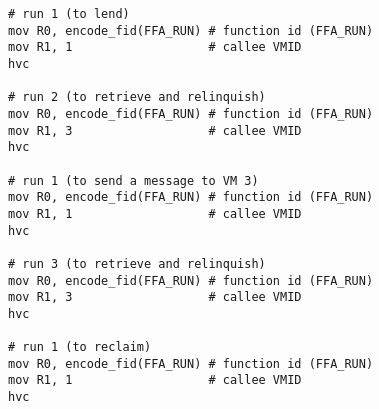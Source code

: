 \documentclass{article}
\begin{document}
\clearpage

\begin{lstlisting}[caption={VM 0}]
# run 1 (to lend)
mov R0, encode_fid(FFA_RUN) # function id (FFA_RUN)
mov R1, 1                   # callee VMID
hvc

# run 2 (to retrieve and relinquish)
mov R0, encode_fid(FFA_RUN) # function id (FFA_RUN)
mov R1, 3                   # callee VMID
hvc

# run 1 (to send a message to VM 3)
mov R0, encode_fid(FFA_RUN) # function id (FFA_RUN)
mov R1, 1                   # callee VMID
hvc

# run 3 (to retrieve and relinquish)
mov R0, encode_fid(FFA_RUN) # function id (FFA_RUN)
mov R1, 3                   # callee VMID
hvc

# run 1 (to reclaim)
mov R0, encode_fid(FFA_RUN) # function id (FFA_RUN)
mov R1, 1                   # callee VMID
hvc
\end{lstlisting}
\end{document}
